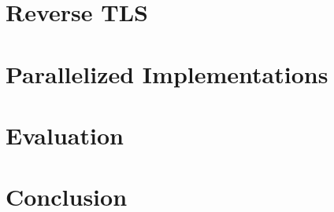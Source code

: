 \documentclass[12pt,a4paper,twoside]{article}
\begin{document}
\section{Reverse TLS}

\section{Parallelized Implementations}

\section{Evaluation}

\section{Conclusion}
\end{document}

